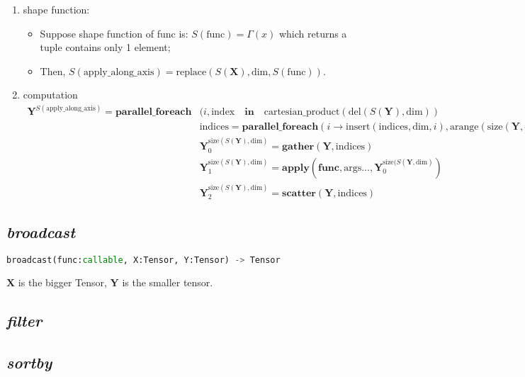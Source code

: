 \begin{enumerate}
  \item shape function:
  \begin{itemize}
    \item Suppose shape function of func is: $S(\text{func}) = \Gamma(x)$ which returns a tuple contains only 1 element;
    \item Then, $S(\text{apply\_along\_axis}) = \text{replace}(S(\mathbf{X}), \text{dim}, S(\text{func}))$.
  \end{itemize}

  \item computation
  \begin{equation*}
    \begin{aligned}
      \mathbf{Y}^{S(\text{apply\_along\_axis})} = \textbf{parallel\_foreach}& (i, \text{index} \quad \textbf{in} \quad \text{cartesian\_product}(\text{del}(S(\mathbf{Y}), \text{dim})) \\
      & \text{indices} = \textbf{parallel\_foreach}(i \rightarrow \text{insert}(\text{indices}, \text{dim}, i), \text{arange}(\text{size}(\mathbf{Y}, \text{dim}))) \\
      & \mathbf{Y}_0^{\text{size}(S(\mathbf{Y}), \text{dim})} = \textbf{gather}(\mathbf{Y}, \text{indices}) \\
      & \mathbf{Y}_1^{\text{size}(S(\mathbf{Y}), \text{dim})} = \textbf{apply}(\textbf{func}, \text{args}..., \mathbf{Y}_0^{\text{size}(S(\mathbf{Y}, \text{dim})}) \\
      & \mathbf{Y}_2^{\text{size}(S(\mathbf{Y}), \text{dim})} = \textbf{scatter}(\mathbf{Y}, \text{indices})
    \end{aligned}
  \end{equation*}
\end{enumerate}

\subsection{\textbf{\textit{broadcast}}}

\begin{lstlisting}[language=Python]
broadcast(func:callable, X:Tensor, Y:Tensor) -> Tensor
\end{lstlisting}

$\mathbf{X}$ is the bigger Tensor, $\mathbf{Y}$ is the smaller tensor.

\subsection{\textbf{\textit{filter}}}

\subsection{\textbf{\textit{sortby}}}
